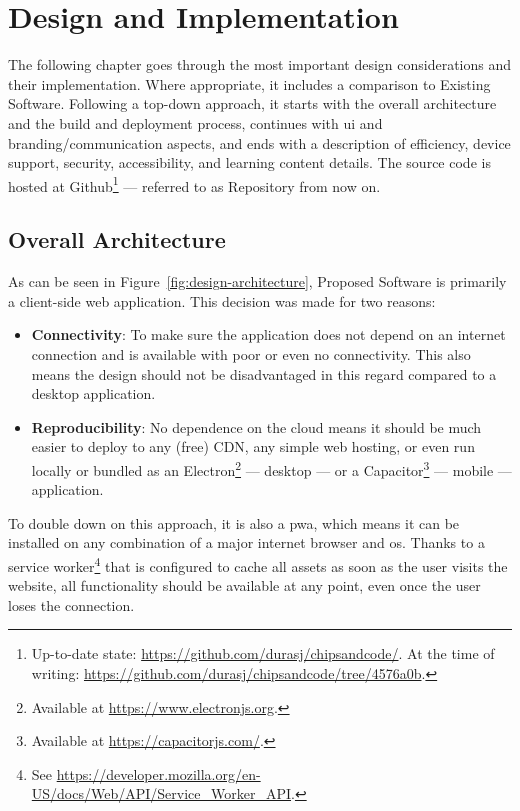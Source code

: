 \chapter{Design and Implementation}
\label{Design-Implementation}

The following chapter goes through the most important design considerations and their implementation.
Where appropriate, it includes a comparison to Existing Software.
Following a top-down approach, it starts with the overall architecture and the build and deployment process, continues with \gls{ui} and branding/communication aspects, and ends with a description of efficiency, device support, security, accessibility, and learning content details.
The source code is hosted at Github\footnote{Up-to-date state: \url{https://github.com/durasj/chipsandcode/}. At the time of writing: \url{https://github.com/durasj/chipsandcode/tree/4576a0b}.} --- referred to as Repository from now on.

\section{Overall Architecture}
\label{sec:architecture}

As can be seen in Figure~\ref{fig:design-architecture}, Proposed Software is primarily a client-side web application.
This decision was made for two reasons:

\begin{itemize}
    \item \textbf{Connectivity}: To make sure the application does not depend on an internet connection and is available with poor or even no connectivity. This also means the design should not be disadvantaged in this regard compared to a desktop application.
    \item \textbf{Reproducibility}: No dependence on the cloud means it should be much easier to deploy to any (free) CDN, any simple web hosting, or even run locally or bundled as an Electron\footnote{Available at \url{https://www.electronjs.org}.} --- desktop --- or a Capacitor\footnote{Available at \url{https://capacitorjs.com/}.} --- mobile --- application.
\end{itemize}

To double down on this approach, it is also a \gls{pwa}, which means it can be installed on any combination of a major internet browser and \gls{os}.
Thanks to a service worker\footnote{See \url{https://developer.mozilla.org/en-US/docs/Web/API/Service_Worker_API}.} that is configured to cache all assets as soon as the user visits the website, all functionality should be available at any point, even once the user loses the connection.

